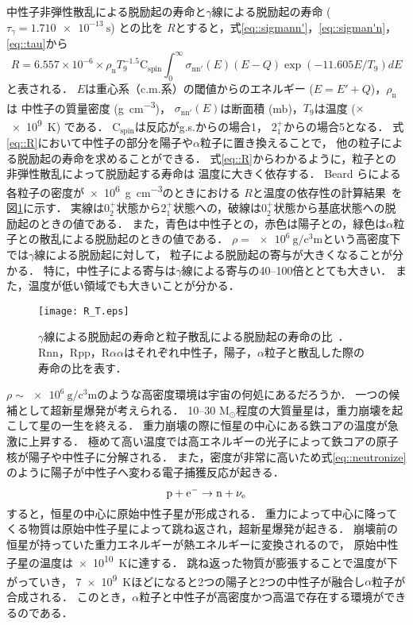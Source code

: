 \documentclass[../master]{subfiles}
\begin{document}
中性子非弾性散乱による脱励起の寿命と$\gamma$線による脱励起の寿命 ($\tau_{\gamma} = \SI{1.710e-13}{\second}$) との比を
$R$とすると，式\eqref{eq::sigmann'}，\eqref{eq::sigman'n}，\eqref{eq::tau}から
\begin{equation}
  R = 6.557\times10^{-6}\times\rho_{\mathrm{n}}T_{9}^{-1.5}\mathrm{C}_{{\text{spin}}}
  \int^{\infty}_{0}\sigma_{\mathrm{nn}'}(E)(E-Q)\exp(-11.605E/T_{9})dE
  \label{eq::R}
\end{equation}
と表される．
$E$は重心系（c.m.系）の閾値からのエネルギー ($E=E'+Q$)，$\rho_{\mathrm{n}}$は
中性子の質量密度 (\si{\gram\per\cubic\centi\metre})，
$\sigma_{\mathrm{nn}'}(E)$は断面積 (\si{\milli\barn})，$T_{9}$は温度 ($\times$\SI{e9}{\kelvin}) である．
$\mathrm{C}_{{\text{spin}}}$は反応がg.s.からの場合1，
$2_{1}^{+}$からの場合5となる．
式\eqref{eq::R}において中性子の部分を陽子や$\alpha$粒子に置き換えることで，
他の粒子による脱励起の寿命を求めることができる．
式\eqref{eq::R}からわかるように，粒子との非弾性散乱によって脱励起する寿命は
温度に大きく依存する．
Beard らによる各粒子の密度が\SI{e6}{\gram\per\cubic\centi\metre}のときにおける
$R$と温度の依存性の計算結果~\cite{hotdensemedium}を図\ref{fig::R}に示す．
実線は$0_2^+$状態から$2_1^+$状態への，破線は$0_2^+$状態から基底状態への脱励起のときの値である．
また，青色は中性子との，赤色は陽子との，緑色は$\alpha$粒子との散乱による脱励起のときの値である．
$\rho = \SI{e6}{\gram\per\cubic\centi\metre}$という高密度下では$\gamma$線による脱励起に対して，
粒子による脱励起の寄与が大きくなることが分かる．
特に，中性子による寄与は$\gamma$線による寄与の40--100倍ととても大きい．
また，温度が低い領域でも大きいことが分かる．
\begin{figure}
  \centering
  \texttt{[image: R\_T.eps]}
  \caption[$\gamma$線による脱励起の寿命と粒子散乱による脱励起の寿命の比．]
          {$\gamma$線による脱励起の寿命と粒子散乱による脱励起の寿命の比~\cite{hotdensemedium}．
    Rnn，Rpp，R$\alpha\alpha$はそれぞれ中性子，陽子，$\alpha$粒子と散乱した際の寿命の比を表す．}
  \label{fig::R}
\end{figure}

$\rho\sim\SI{e6}{\gram\per\cubic\centi\metre}$のような高密度環境は宇宙の何処にあるだろうか．
一つの候補として超新星爆発が考えられる．
10--30 $\mathrm{M_{\odot}}$程度の大質量星は，重力崩壊を起こして星の一生を終える．
重力崩壊の際に恒星の中心にある鉄コアの温度が急激に上昇する．
極めて高い温度では高エネルギーの光子によって鉄コアの原子核が陽子や中性子に分解される．
また，密度が非常に高いため式\eqref{eq::neutronize}のように陽子が中性子へ変わる電子捕獲反応が起きる．
\begin{equation}
  {\rm p}+{\rm e}^{-} \rightarrow {\rm n}+\nu_{\rm e}
  \label{eq::neutronize}
\end{equation}
すると，恒星の中心に原始中性子星が形成される．
重力によって中心に降ってくる物質は原始中性子星によって跳ね返され，超新星爆発が起きる．
崩壊前の恒星が持っていた重力エネルギーが熱エネルギーに変換されるので，
原始中性子星の温度は\SI{e10}{\kelvin}に達する．
跳ね返った物質が膨張することで温度が下がっていき，
\SI{7e9}{\kelvin}ほどになると2つの陽子と2つの中性子が融合し$\alpha$粒子が合成される．
このとき，$\alpha$粒子と中性子が高密度かつ高温で存在する環境ができるのである．
\end{document}
